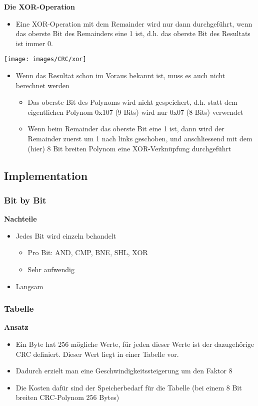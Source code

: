 \textbf{Die XOR-Operation}
\begin{multicols}{2}
\begin{itemize}
	\item Eine XOR-Operation mit dem Remainder wird nur dann durchgeführt, wenn das oberste Bit des Remainders eine 1 ist, d.h. das oberste Bit des Resultats ist	immer 0.
\end{itemize}
\vfill\null
\columnbreak
\texttt{[image: images/CRC/xor]}
\end{multicols}
\begin{itemize}
\item Wenn das Resultat schon im Voraus bekannt ist, muss es auch nicht berechnet werden
\begin{itemize}
	\item Das oberste Bit des Polynoms wird nicht gespeichert, d.h. statt dem eigentlichen Polynom 0x107 (9 Bits) wird nur 0x07 (8 Bits) verwendet
	\item Wenn beim Remainder das oberste Bit eine 1 ist, dann wird der Remainder zuerst um 1 nach links geschoben, und anschliessend mit dem (hier) 8 Bit breiten Polynom eine XOR-Verknüpfung durchgeführt
\end{itemize}
\end{itemize}

\subsection{Implementation}
\subsubsection{Bit by Bit}
 

\textbf{Nachteile}
\begin{itemize}
	\item Jedes Bit wird einzeln behandelt
	\begin{itemize}
		\item Pro Bit: AND, CMP, BNE, SHL, XOR
		\item Sehr aufwendig
	\end{itemize}
	\item Langsam
\end{itemize}


\subsubsection{Tabelle}
\textbf{Ansatz}
\begin{itemize}
	\item Ein Byte hat 256 mögliche Werte, für jeden dieser Werte ist der dazugehörige CRC definiert. Dieser Wert liegt in einer Tabelle vor.
	\item Dadurch erzielt man eine Geschwindigkeitssteigerung um den Faktor 8
	\item Die Kosten dafür sind der Speicherbedarf für die Tabelle (bei einem 8 Bit breiten CRC-Polynom 256 Bytes)
\end{itemize}



